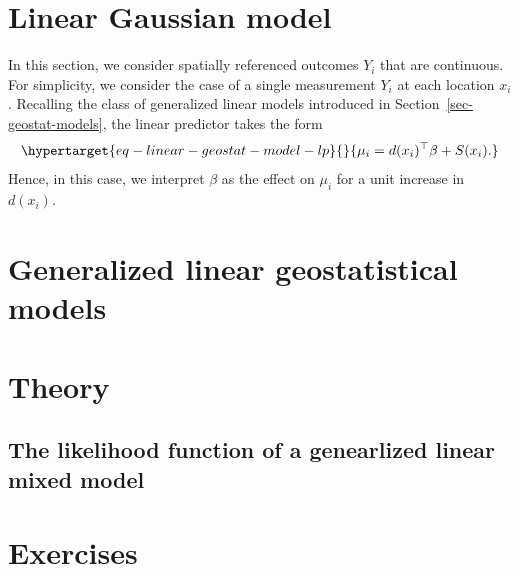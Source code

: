 \documentclass[
  letterpaper,
]{krantz}
\begin{document}
\hypertarget{sec-linear-model}{%
\section{Linear Gaussian model}\label{sec-linear-model}}

In this section, we consider spatially referenced outcomes \(Y_i\) that
are continuous. For simplicity, we consider the case of a single
measurement \(Y_i\) at each location \(x_i\). Recalling the class of
generalized linear models introduced in
Section~\ref{sec-geostat-models}, the linear predictor takes the form
\begin{equation}\protect\hypertarget{eq-linear-geostat-model-lp}{}{
\mu_{i} = d(x_i)^\top \beta + S(x_i).
}\label{eq-linear-geostat-model-lp}\end{equation} Hence, in this case,
we interpret \(\beta\) as the effect on \(\mu_i\) for a unit increase in
\(d(x_i)\).

\hypertarget{generalized-linear-geostatistical-models}{%
\section{Generalized linear geostatistical
models}\label{generalized-linear-geostatistical-models}}

\hypertarget{theory}{%
\section{Theory}\label{theory}}

\hypertarget{the-likelihood-function-of-a-genearlized-linear-mixed-model}{%
\subsection{The likelihood function of a genearlized linear mixed
model}\label{the-likelihood-function-of-a-genearlized-linear-mixed-model}}

\hypertarget{exercises}{%
\section{Exercises}\label{exercises}}
\end{document}

